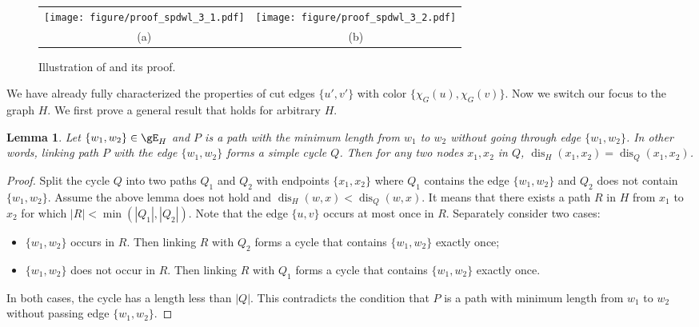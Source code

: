 \documentclass{article} %
\let\cref\crtcref
\newtheorem{lemma}[theorem]{Lemma}
\newcommand*{\dis}{{\operatorname{dis}}}
\begin{document}
\begin{figure}[t]
    \centering
    \small
    \setlength\tabcolsep{15pt}
    \begin{tabular}{cc}
        \texttt{[image: figure/proof\_spdwl\_3\_1.pdf]} & \texttt{[image: figure/proof\_spdwl\_3\_2.pdf]} \\
        (a) & (b)
    \end{tabular}
    \vspace{-7pt}
    \caption{Illustration of \cref{thm:spdwl_case1_5} and its proof.}
    \label{fig:proof_spdwl_3}
    \vspace{-5pt}
\end{figure}

We have already fully characterized the properties of cut edges $\{u',v'\}$ with color $\{\chi_G(u),\chi_G(v)\}$. Now we switch our focus to the graph $H$. We first prove a general result that holds for arbitrary $H$.

\begin{lemma}
\label{thm:spdwl_case1_6}
Let $\{w_1,w_2\}\in \gE_H$ and $P$ is a path with the minimum length from $w_1$ to $w_2$ without going through edge $\{w_1,w_2\}$. In other words, linking path $P$ with the edge $\{w_1,w_2\}$ forms a simple cycle $Q$. Then for any two nodes $x_1,x_2$ in $Q$, $\dis_H(x_1,x_2)=\dis_Q(x_1,x_2)$.
\end{lemma}
\begin{proof}
Split the cycle $Q$ into two paths $Q_1$ and $Q_2$ with endpoints $\{x_1,x_2\}$ where $Q_1$ contains the edge $\{w_1,w_2\}$ and $Q_2$ does not contain $\{w_1,w_2\}$. Assume the above lemma does not hold and $\dis_H(w,x)<\dis_Q(w,x)$. It means that there exists a path $R$ in $H$ from $x_1$ to $x_2$ for which $|R|<\min(|Q_1|,|Q_2|)$. Note that the edge $\{u,v\}$ occurs at most once in $R$. Separately consider two cases:
\begin{itemize}[topsep=0pt,leftmargin=30pt]
\setlength{\itemsep}{0pt}
    \item $\{w_1,w_2\}$ occurs in $R$. Then linking $R$ with $Q_2$ forms a cycle that contains $\{w_1,w_2\}$ exactly once;
    \item $\{w_1,w_2\}$ does not occur in $R$. Then linking $R$ with $Q_1$ forms a cycle that contains $\{w_1,w_2\}$ exactly once.
\end{itemize}
In both cases, the cycle has a length less than $|Q|$. This contradicts the condition that $P$ is a path with minimum length from $w_1$ to $w_2$ without passing edge $\{w_1,w_2\}$. 
\end{proof}
\end{document}
